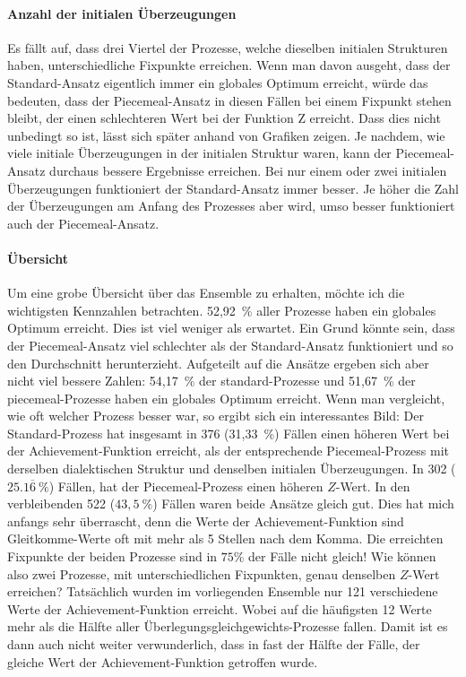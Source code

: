\documentclass{article}
\begin{document}
\paragraph{Anzahl der initialen Überzeugungen} Es fällt auf, dass drei Viertel der Prozesse, welche dieselben initialen Strukturen haben, unterschiedliche Fixpunkte erreichen. Wenn man davon ausgeht, dass der Standard-Ansatz eigentlich immer ein globales Optimum erreicht, würde das bedeuten, dass der Piecemeal-Ansatz in diesen Fällen bei einem Fixpunkt stehen bleibt, der einen schlechteren Wert bei der Funktion Z erreicht. Dass dies nicht unbedingt so ist, lässt sich später anhand von Grafiken zeigen. Je nachdem, wie viele initiale Überzeugungen in der initialen Struktur waren, kann der Piecemeal-Ansatz durchaus bessere Ergebnisse erreichen. Bei nur einem oder zwei initialen Überzeugungen funktioniert der Standard-Ansatz immer besser. Je höher die Zahl der Überzeugungen am Anfang des Prozesses aber wird, umso besser funktioniert auch der Piecemeal-Ansatz.

\paragraph{Übersicht} Um eine grobe Übersicht über das Ensemble zu erhalten, möchte ich die wichtigsten Kennzahlen betrachten. 52,92~\% aller Prozesse haben ein globales Optimum erreicht. Dies ist viel weniger als erwartet. Ein Grund könnte sein, dass der Piecemeal-Ansatz viel schlechter als der Standard-Ansatz funktioniert und so den Durchschnitt herunterzieht. Aufgeteilt auf die Ansätze ergeben sich aber nicht viel bessere Zahlen: 54,17~\% der standard-Prozesse und 51,67~\% der piecemeal-Prozesse haben ein globales Optimum erreicht. Wenn man vergleicht, wie oft welcher Prozess besser war, so ergibt sich ein interessantes Bild: Der Standard-Prozess hat insgesamt in 376 (31,33~\%) Fällen einen höheren Wert bei der Achievement-Funktion erreicht, als der entsprechende Piecemeal-Prozess mit derselben dialektischen Struktur und denselben initialen Überzeugungen. In 302 ($25.1\overline{6}~\%$) Fällen, hat der Piecemeal-Prozess einen höheren $Z$-Wert. In den verbleibenden 522 ($43,5~\%$) Fällen waren beide Ansätze gleich gut. Dies hat mich anfangs sehr überrascht, denn die Werte der Achievement-Funktion sind Gleitkomme-Werte oft mit mehr als 5 Stellen nach dem Komma. Die erreichten Fixpunkte der beiden Prozesse sind in $75\%$ der Fälle nicht gleich! Wie können also zwei Prozesse, mit unterschiedlichen Fixpunkten, genau denselben $Z$-Wert erreichen? Tatsächlich wurden im vorliegenden Ensemble nur 121 verschiedene Werte der Achievement-Funktion erreicht. Wobei auf die häufigsten 12 Werte mehr als die Hälfte aller Überlegungsgleichgewichts-Prozesse fallen. Damit ist es dann auch nicht weiter verwunderlich, dass in fast der Hälfte der Fälle, der gleiche Wert der Achievement-Funktion getroffen wurde.
\end{document}

